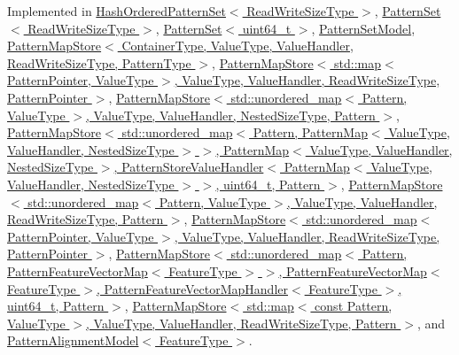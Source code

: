 Implemented in \hyperlink{classHashOrderedPatternSet_a5410dc1022729fe531e7ef7dcd0e845c}{Hash\+Ordered\+Pattern\+Set$<$ Read\+Write\+Size\+Type $>$}, \hyperlink{classPatternSet_ae55073ee2384d529faf51fca22c8dee1}{Pattern\+Set$<$ Read\+Write\+Size\+Type $>$}, \hyperlink{classPatternSet_ae55073ee2384d529faf51fca22c8dee1}{Pattern\+Set$<$ uint64\+\_\+t $>$}, \hyperlink{classPatternSetModel_a8b5731f823fd868cfc6b219e01b13343}{Pattern\+Set\+Model}, \hyperlink{classPatternMapStore_aa6400b6ff29f93c3e1c73355363c2476}{Pattern\+Map\+Store$<$ Container\+Type, Value\+Type, Value\+Handler, Read\+Write\+Size\+Type, Pattern\+Type $>$}, \hyperlink{classPatternMapStore_aa6400b6ff29f93c3e1c73355363c2476}{Pattern\+Map\+Store$<$ std\+::map$<$ Pattern\+Pointer, Value\+Type $>$, Value\+Type, Value\+Handler, Read\+Write\+Size\+Type, Pattern\+Pointer $>$}, \hyperlink{classPatternMapStore_aa6400b6ff29f93c3e1c73355363c2476}{Pattern\+Map\+Store$<$ std\+::unordered\+\_\+map$<$ Pattern, Value\+Type $>$, Value\+Type, Value\+Handler, Nested\+Size\+Type, Pattern $>$}, \hyperlink{classPatternMapStore_aa6400b6ff29f93c3e1c73355363c2476}{Pattern\+Map\+Store$<$ std\+::unordered\+\_\+map$<$ Pattern, Pattern\+Map$<$ Value\+Type, Value\+Handler, Nested\+Size\+Type $>$ $>$, Pattern\+Map$<$ Value\+Type, Value\+Handler, Nested\+Size\+Type $>$, Pattern\+Store\+Value\+Handler$<$ Pattern\+Map$<$ Value\+Type, Value\+Handler, Nested\+Size\+Type $>$ $>$, uint64\+\_\+t, Pattern $>$}, \hyperlink{classPatternMapStore_aa6400b6ff29f93c3e1c73355363c2476}{Pattern\+Map\+Store$<$ std\+::unordered\+\_\+map$<$ Pattern, Value\+Type $>$, Value\+Type, Value\+Handler, Read\+Write\+Size\+Type, Pattern $>$}, \hyperlink{classPatternMapStore_aa6400b6ff29f93c3e1c73355363c2476}{Pattern\+Map\+Store$<$ std\+::unordered\+\_\+map$<$ Pattern\+Pointer, Value\+Type $>$, Value\+Type, Value\+Handler, Read\+Write\+Size\+Type, Pattern\+Pointer $>$}, \hyperlink{classPatternMapStore_aa6400b6ff29f93c3e1c73355363c2476}{Pattern\+Map\+Store$<$ std\+::unordered\+\_\+map$<$ Pattern, Pattern\+Feature\+Vector\+Map$<$ Feature\+Type $>$ $>$, Pattern\+Feature\+Vector\+Map$<$ Feature\+Type $>$, Pattern\+Feature\+Vector\+Map\+Handler$<$ Feature\+Type $>$, uint64\+\_\+t, Pattern $>$}, \hyperlink{classPatternMapStore_aa6400b6ff29f93c3e1c73355363c2476}{Pattern\+Map\+Store$<$ std\+::map$<$ const Pattern, Value\+Type $>$, Value\+Type, Value\+Handler, Read\+Write\+Size\+Type, Pattern $>$}, and \hyperlink{classPatternAlignmentModel_a335c3f85686db801fafeb328bf8df5e8}{Pattern\+Alignment\+Model$<$ Feature\+Type $>$}.



